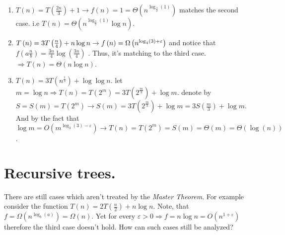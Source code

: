 \begin{example}
\begin{enumerate}
    \item \( T\left(n\right) =  T\left(\frac{2n}{3}\right) + 1 \rightarrow f\left(n\right) = 1 =\Theta \left( n^{\log_{\frac{3}{2}} \left(1\right)}\right)\) matches the second case. i.e  \( T\left(n\right) = \Theta \left( n^{\log_{\frac{3}{2}} \left(1\right)}\log n \right)\).
    
    \item \( T\left(n\right) = 3 T\left(\frac{n}{4}\right) + n\log n \rightarrow f\left(n\right) = \Omega\left( n^{\log_{4}\left(3\right) + \varepsilon}  \right) \) and notice that \( f\left( a\frac{n}{b}\right) = \frac{3n}{4}\log\left(\frac{3n}{4}\right)\) . Thus, it's matching to the third case. \(\Rightarrow T\left(n\right) = \Theta\left(n\log n\right)\).
    
    \item \(T\left(n\right) = 3T\left( n^{\frac{1}{3}}\right) + \log\log n\). let \( m = \log n \Rightarrow T\left( n\right) = T \left(2^m \right) = 3T\left(2^{\frac{m}{3}} \right) + \log m\). denote by \(S = S\left(m\right) = T\left(2^m\right) \rightarrow S\left(m\right) = 3T\left(2^{\frac{m}{3}} \right) + \log m = 3S\left(\frac{m}{3} \right) + \log m\). And by the fact that \(\log m = O\left(m^{\log_{3}\left(3\right)-\varepsilon} \right) \rightarrow T\left(n\right) = T\left(2^m\right) = S\left(m\right) = \Theta\left(m\right) = \Theta\left( \log(n)\right) \).  
\end{enumerate}
\end{example}

\section{Recursive trees.}
There are still cases which aren't treated by the \textit{Master Theorem}. For example consider the function \(T\left(n\right) = 2T\left(\frac{n}{2}\right) + n\log n \). Note, that \(f = \Omega\left( n^{\log_{b}(a)} \right) = \Omega\left(n\right)\). Yet for every \( \varepsilon > 0 \Rightarrow f = n\log n = O\left( n^{1+\varepsilon} \right) \) therefore the third case  doesn't hold. How can such cases still be analyzed? 

